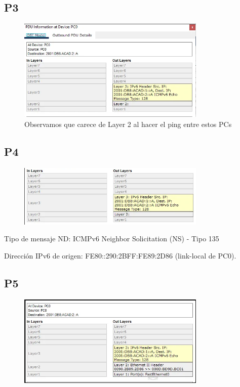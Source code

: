 \documentclass{article}
\begin{document}
\subsection*{P3}
\begin{figure}[h]
    \centering
    \includegraphics[width=0.8\textwidth]{imagen5.PNG}
    \caption{Observamos que carece de Layer 2 al hacer el ping entre estos PCs}
    \label{fig:ejemplo}
\end{figure}

\subsection*{P4}

\begin{figure}[H] 
    \centering
    \includegraphics[width=0.8\textwidth]{imagen6.PNG}
    \caption{}
    \label{fig:ejemplo}
\end{figure}

Tipo de mensaje ND: ICMPv6 Neighbor Solicitation (NS) - Tipo 135

Dirección IPv6 de origen: FE80::290:2BFF:FE89:2D86 (link-local de PC0).

\subsection*{P5}
\begin{figure}[H] 
    \centering
    \includegraphics[width=0.8\textwidth]{imagen7.PNG}
    \caption{}
    \label{fig:ejemplo}
\end{figure}
\end{document}
